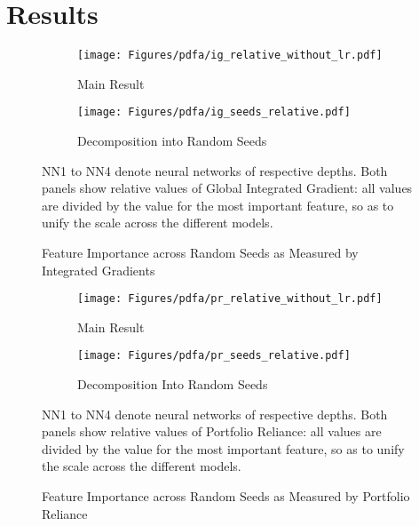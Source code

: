 \chapter{Results}
\label{chap:res} 
	
	\begin{figure}	
	\centering		
	\begin{subfigure}[t]{\textwidth}
		\texttt{[image: Figures/pdfa/ig\_relative\_without\_lr.pdf]}
		\caption{Main Result}
		\label{fig:ig_seeds_main}
	\end{subfigure}
	
	\begin{subfigure}[t]{\textwidth}
		\centering
		\texttt{[image: Figures/pdfa/ig\_seeds\_relative.pdf]}
		\caption{Decomposition into Random Seeds}
		\label{fig:ig_seeds_relative}
	\end{subfigure}
	\caption{Feature Importance across Random Seeds as Measured by Integrated Gradients}
	\label{fig:ig_seeds}
	\medskip
	\small
	NN1 to NN4 denote neural networks of respective depths. Both panels show relative values of Global Integrated Gradient: all values are divided by the value for the most important feature, so as to unify the scale across the different models. 
\end{figure}

\begin{figure}	
	\centering		
	\begin{subfigure}[t]{\textwidth}
		\texttt{[image: Figures/pdfa/pr\_relative\_without\_lr.pdf]}
		\caption{Main Result}
		\label{fig:pr_seeds_main}
	\end{subfigure}
	
	\begin{subfigure}[t]{\textwidth}
		\centering
		\texttt{[image: Figures/pdfa/pr\_seeds\_relative.pdf]}
		\caption{Decomposition Into Random Seeds}
		\label{fig:pr_seeds_relative}
	\end{subfigure}
	\caption{Feature Importance across Random Seeds as Measured by Portfolio Reliance}
	\label{fig:pr_seeds}
	\medskip
	\small
	NN1 to NN4 denote neural networks of respective depths. Both panels show relative values of Portfolio Reliance: all values are divided by the value for the most important feature, so as to unify the scale across the different models.
\end{figure}



	 

	
	